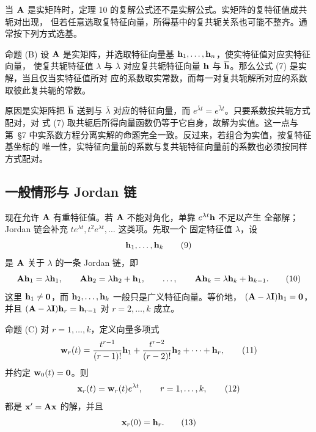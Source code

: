当 \(\mathbf{A}\) 是实矩阵时，定理 10 的复解公式还不是实解公式。实矩阵的复特征值成共轭对出现，
但若任意选取复特征向量，所得基中的复共轭关系也可能不整齐。通常按下列方式选基。

\begin{sourceitem}{命题 (B)}
设 \(\mathbf{A}\) 是实矩阵，并选取特征向量基 \(\vect{h}_1,\ldots,\vect{h}_n\)，使实特征值对应实特征向量，
使复共轭特征值 \(\lambda\) 与 \(\overline\lambda\) 对应复共轭特征向量
\(\vect{h}\) 与 \(\overline{\vect{h}}\)。那么公式 (7) 是实解，当且仅当实特征值所对
应的系数取实常数，而每一对复共轭解所对应的系数取彼此复共轭的常数。
\end{sourceitem}

原因是实矩阵把 \(\overline{\vect{h}}\) 送到与 \(\overline\lambda\) 对应的特征向量，而
\(e^{\overline\lambda t}=\overline{e^{\lambda t}}\)。只要系数按共轭方式配对，对
式 (7) 取共轭后所得向量函数仍等于它自身，故解为实值。这一点与
第~\S7 中实系数方程分离实解的命题完全一致。反过来，若组合为实值，按复特征基坐标的
唯一性，实特征向量前的系数与复共轭特征向量前的系数也必须按同样方式配对。

\subsection*{一般情形与 Jordan 链}

现在允许 \(\mathbf{A}\) 有重特征值。若 \(\mathbf{A}\) 不能对角化，单靠 \(e^{\lambda t}\vect{h}\) 不足以产生
全部解；Jordan 链会补充 \(t e^{\lambda t},t^2e^{\lambda t},\ldots\) 这类项。先取一个
固定特征值 \(\lambda\)，设
\begin{equation}
 \vect{h}_1,\ldots,\vect{h}_k
 \tag{9}
\end{equation}
是 \(\mathbf{A}\) 关于 \(\lambda\) 的一条 Jordan 链，即
\begin{equation}
 \mat{A}\vect{h}_1=\lambda \vect{h}_1,\qquad
 \mat{A}\vect{h}_2=\lambda \vect{h}_2+\vect{h}_1,\qquad
 \ldots,\qquad
 \mat{A}\vect{h}_k=\lambda \vect{h}_k+\vect{h}_{k-1}.
 \tag{10}
\end{equation}
这里 \(\vect{h}_1\neq\vect{0}\)，而 \(\vect{h}_2,\ldots,\vect{h}_k\) 一般只是广义特征向量。等价地，
\((\mat{A}-\lambda \mat{I})\vect{h}_1=\vect{0}\)，并且 \((\mat{A}-\lambda \mat{I})\vect{h}_r=\vect{h}_{r-1}\) 对
\(r=2,\ldots,k\) 成立。

\begin{sourceitem}{命题 (C)}
对 \(r=1,\ldots,k\)，定义向量多项式
\begin{equation}
 \vect{w}_r(t)=\frac{t^{r-1}}{(r-1)!}\vect{h}_1
       +\frac{t^{r-2}}{(r-2)!}\vect{h}_2
       +\cdots+\vect{h}_r,
 \tag{11}
\end{equation}
并约定 \(\vect{w}_0(t)=\vect{0}\)。则
\begin{equation}
 \vect{x}_r(t)=\vect{w}_r(t)e^{\lambda t},\qquad r=1,\ldots,k,
 \tag{12}
\end{equation}
都是 \(\vect{x}'=\mat{A}\vect{x}\) 的解，并且
\begin{equation}
 \vect{x}_r(0)=\vect{h}_r.
 \tag{13}
\end{equation}
\end{sourceitem}

